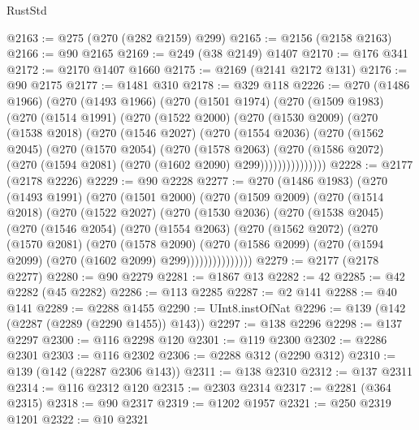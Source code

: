\begin{lexlean}{RustStd}
\begin{coremodule}
@2163 := @275 (@270 (@282 @2159) @299)
@2165 := @2156 (@2158 @2163)
@2166 := @90 @2165
@2169 := @249 (@38 @2149) @1407
@2170 := @176 @341
@2172 := @2170 @1407 @1660
@2175 := @2169 (@2141 @2172 @131)
@2176 := @90 @2175
@2177 := @1481 @310
@2178 := @329 @118
@2226 := @270
    (@1486 @1966)
    (@270
      (@1493 @1966)
      (@270
        (@1501 @1974)
        (@270
          (@1509 @1983)
          (@270
            (@1514 @1991)
            (@270
              (@1522 @2000)
              (@270
                (@1530 @2009)
                (@270
                  (@1538 @2018)
                  (@270
                    (@1546 @2027)
                    (@270
                      (@1554 @2036)
                      (@270
                        (@1562 @2045)
                        (@270
                          (@1570 @2054)
                          (@270
                            (@1578 @2063)
                            (@270
                              (@1586 @2072)
                              (@270 (@1594 @2081) (@270 (@1602 @2090) @299)))))))))))))))
@2228 := @2177 (@2178 @2226)
@2229 := @90 @2228
@2277 := @270
    (@1486 @1983)
    (@270
      (@1493 @1991)
      (@270
        (@1501 @2000)
        (@270
          (@1509 @2009)
          (@270
            (@1514 @2018)
            (@270
              (@1522 @2027)
              (@270
                (@1530 @2036)
                (@270
                  (@1538 @2045)
                  (@270
                    (@1546 @2054)
                    (@270
                      (@1554 @2063)
                      (@270
                        (@1562 @2072)
                        (@270
                          (@1570 @2081)
                          (@270
                            (@1578 @2090)
                            (@270
                              (@1586 @2099)
                              (@270 (@1594 @2099) (@270 (@1602 @2099) @299)))))))))))))))
@2279 := @2177 (@2178 @2277)
@2280 := @90 @2279
@2281 := @1867 @13
@2282 := 42
@2285 := @42 @2282 (@45 @2282)
@2286 := @113 @2285
@2287 := @2 @141
@2288 := @40 @141
@2289 := @2288 @1455
@2290 := UInt8.instOfNat
@2296 := @139 (@142 (@2287 (@2289 (@2290 @1455)) @143))
@2297 := @138 @2296
@2298 := @137 @2297
@2300 := @116 @2298 @120
@2301 := @119 @2300
@2302 := @2286 @2301
@2303 := @116 @2302
@2306 := @2288 @312 (@2290 @312)
@2310 := @139 (@142 (@2287 @2306 @143))
@2311 := @138 @2310
@2312 := @137 @2311
@2314 := @116 @2312 @120
@2315 := @2303 @2314
@2317 := @2281 (@364 @2315)
@2318 := @90 @2317
@2319 := @1202 @1957
@2321 := @250 @2319 @1201
@2322 := @10 @2321

\end{coremodule}
\end{lexlean}
